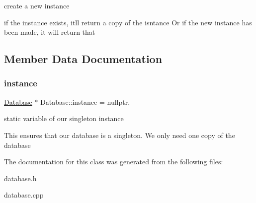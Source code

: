 create a new instance

if the instance exists, it\textquotesingle{}ll return a copy of the isntance Or if the new instance has been made, it will return that 

\subsection{Member Data Documentation}
\mbox{\label{class_database_a5926460fe1c15c95d470fcde637f8d22}} 
\subsubsection{\texorpdfstring{instance}{instance}}
{\footnotesize\ttfamily \hyperlink{class_database}{Database} $\ast$ Database\+::instance = nullptr\hspace{0.3cm}{\ttfamily [static]}, {\ttfamily [private]}}

static variable of our singleton instance

This ensures that our database is a singleton. We only need one copy of the database 

The documentation for this class was generated from the following files\+:\begin{DoxyCompactItemize}
\item 
database.\+h\item 
database.\+cpp\end{DoxyCompactItemize}
